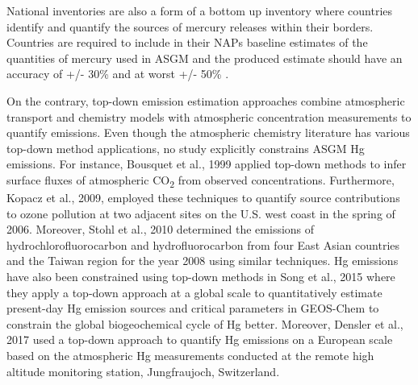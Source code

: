 National inventories are also a form of a bottom up inventory where countries identify and quantify the sources of mercury releases within their borders. Countries are required to include in their NAPs baseline estimates of the quantities of mercury used in ASGM and the produced estimate should have an accuracy of +/- 30\% and at worst +/- 50\% \cite{united_nations_environment_programme_estimating_2017}.

\begin{flushleft}
On the contrary, top-down emission estimation approaches combine atmospheric transport and chemistry models with atmospheric concentration measurements to quantify emissions. Even though the atmospheric chemistry literature has various top-down method applications, no study explicitly constrains ASGM Hg emissions. For instance, Bousquet et al., 1999 applied top-down methods to infer surface fluxes of atmospheric CO\textsubscript{2} from observed concentrations\cite{bousquet_inverse_1999}. Furthermore, Kopacz et al., 2009, employed these techniques to quantify source contributions to ozone pollution at two adjacent sites on the U.S. west coast in the spring of 2006. Moreover, Stohl et al., 2010 determined the emissions of hydrochlorofluorocarbon and hydrofluorocarbon from four East Asian countries and the Taiwan region for the year 2008 using similar techniques. Hg emissions have also been constrained using top-down methods in Song et al., 2015 where they apply a top-down approach at a global scale to quantitatively estimate present-day Hg emission sources and critical parameters in GEOS-Chem to constrain the global biogeochemical cycle of Hg better. Moreover, Densler et al., 2017 used a top-down approach to quantify Hg emissions on a European scale based on the atmospheric Hg measurements conducted at the remote high altitude monitoring station, Jungfraujoch, Switzerland. 
\end{flushleft}
